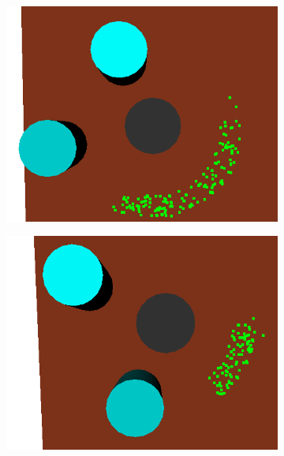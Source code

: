 \begin{figure}
  \centering
  \begin{subfigure}[b]{0.3\linewidth}
    \includegraphics[width=\textwidth]{images/finalgraspnoobstr.png}
    \caption{}
  \end{subfigure}
  \begin{subfigure}[b]{0.3\linewidth}
    \includegraphics[width=\textwidth]{images/finalgraspobstr.png}
    \caption{}
  \end{subfigure}
  \begin{subfigure}[b]{0.3\linewidth}

\end{subfigure}
\end{figure}
